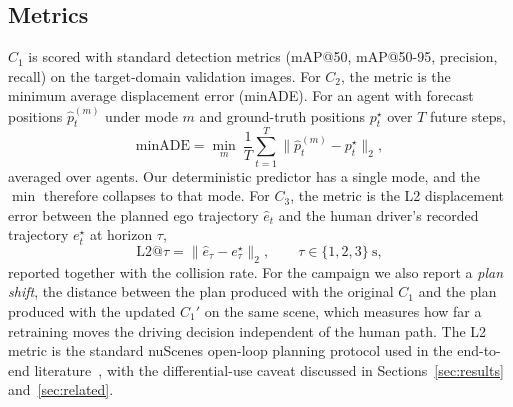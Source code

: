 \documentclass[conference]{IEEEtran}
\begin{document}
\subsection{Metrics}
\label{sec:metrics}
$C_1$ is scored with standard detection metrics (mAP@50, mAP@50-95, precision,
recall) on the target-domain validation images. For $C_2$, the metric is the
minimum average displacement error (minADE). For an agent with forecast positions
$\hat{p}^{(m)}_{t}$ under mode $m$ and ground-truth positions $p^{\star}_{t}$ over
$T$ future steps,
\begin{equation}
\mathrm{minADE} = \min_{m}\ \frac{1}{T}\sum_{t=1}^{T}
\bigl\lVert \hat{p}^{(m)}_{t} - p^{\star}_{t} \bigr\rVert_2 ,
\label{eq:minade}
\end{equation}
averaged over agents. Our deterministic predictor has a single mode, and the
$\min$ therefore collapses to that mode. For $C_3$, the metric is the L2 displacement error between
the planned ego trajectory $\hat{e}_t$ and the human driver's recorded trajectory
$e^{\star}_t$ at horizon $\tau$,
\begin{equation}
\mathrm{L2}@\tau = \bigl\lVert \hat{e}_{\tau} - e^{\star}_{\tau} \bigr\rVert_2 ,
\qquad \tau \in \{1,2,3\}\ \text{s},
\label{eq:l2}
\end{equation}
reported together with the collision rate. For the campaign we also report a
\emph{plan shift}, the distance between the plan produced with the original $C_1$
and the plan produced with the updated $C_1'$ on the same scene, which measures how
far a retraining moves the driving decision independent of the human path. The L2
metric is the standard nuScenes open-loop planning protocol used in the
end-to-end literature~\cite{hu2023uniad,jiang2023vad,zhai2023rethinking}, with the
differential-use caveat discussed in Sections~\ref{sec:results}
and~\ref{sec:related}.
\end{document}
